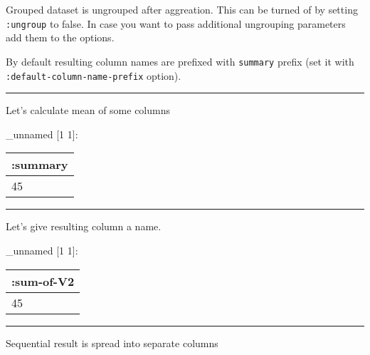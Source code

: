 \documentclass[]{article}
\newenvironment{Shaded}{\begin{snugshade}}{\end{snugshade}}
\newcommand{\KeywordTok}[1]{\textcolor[rgb]{0.13,0.29,0.53}{\textbf{#1}}}
\newcommand{\VariableTok}[1]{\textcolor[rgb]{0.00,0.00,0.00}{#1}}
\newcommand{\AttributeTok}[1]{\textcolor[rgb]{0.77,0.63,0.00}{#1}}
\newcommand{\NormalTok}[1]{#1}
\begin{document}
Grouped dataset is ungrouped after aggreation. This can be turned of by
setting \texttt{:ungroup} to false. In case you want to pass additional
ungrouping parameters add them to the options.

By default resulting column names are prefixed with \texttt{summary}
prefix (set it with \texttt{:default-column-name-prefix} option).

\begin{center}\rule{0.5\linewidth}{0.5pt}\end{center}

Let's calculate mean of some columns

\begin{Shaded}
\end{Shaded}

\_unnamed {[}1 1{]}:

\begin{longtable}[]{@{}l@{}}
\toprule
:summary\tabularnewline
\midrule
\endhead
45\tabularnewline
\bottomrule
\end{longtable}

\begin{center}\rule{0.5\linewidth}{0.5pt}\end{center}

Let's give resulting column a name.

\begin{Shaded}
\end{Shaded}

\_unnamed {[}1 1{]}:

\begin{longtable}[]{@{}l@{}}
\toprule
:sum-of-V2\tabularnewline
\midrule
\endhead
45\tabularnewline
\bottomrule
\end{longtable}

\begin{center}\rule{0.5\linewidth}{0.5pt}\end{center}

Sequential result is spread into separate columns
\end{document}
